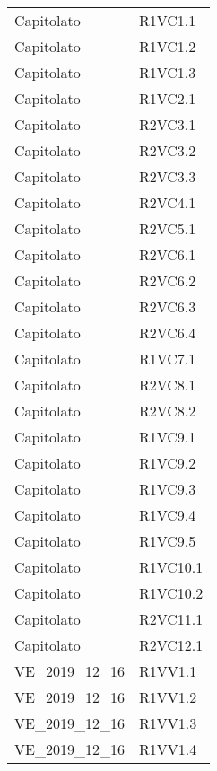 {\begin{longtable}{ C{4cm} C{4cm}}

Capitolato & R1VC1.1\\

Capitolato & R1VC1.2\\

Capitolato & R1VC1.3\\

Capitolato & R1VC2.1\\

Capitolato & R2VC3.1\\

Capitolato & R2VC3.2\\

Capitolato & R2VC3.3\\

Capitolato & R2VC4.1\\

Capitolato & R2VC5.1\\


Capitolato & R2VC6.1\\

Capitolato & R2VC6.2\\

Capitolato & R2VC6.3\\

Capitolato & R2VC6.4\\

Capitolato & R1VC7.1\\

Capitolato & R2VC8.1\\

Capitolato & R2VC8.2\\

Capitolato & R1VC9.1\\

Capitolato & R1VC9.2\\

Capitolato & R1VC9.3\\

Capitolato & R1VC9.4\\

Capitolato & R1VC9.5\\

Capitolato & R1VC10.1\\

Capitolato & R1VC10.2\\

Capitolato & R2VC11.1\\

Capitolato & R2VC12.1\\


VE\_2019\_12\_16 & R1VV1.1\\

VE\_2019\_12\_16 & R1VV1.2\\

VE\_2019\_12\_16 & R1VV1.3\\

VE\_2019\_12\_16 & R1VV1.4\\


\end{longtable}
}